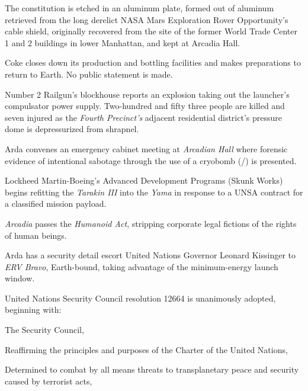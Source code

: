 The constitution is etched in an aluminum plate, formed out of aluminum retrieved from the long derelict NASA Mars Exploration Rover Opportunity's cable shield, originally recovered from the site of the former World Trade Center 1 and 2 buildings in lower Manhattan, and kept at Arcadia Hall.

\StopTimelineDate

Coke closes down its production and bottling facilities and makes preparations to return to Earth. No public statement is made.
\StopTimelineDate

Number 2 Railgun's blockhouse reports an explosion taking out the launcher's compulsator power supply. Two-hundred and fifty three people are killed and seven injured as the {\it Fourth Precinct's} adjacent residential district's pressure dome is depressurized from shrapnel.

Arda convenes an emergency cabinet meeting at {\it Arcadian Hall} where forensic evidence of intentional sabotage through the use of a cryobomb (/) is presented.
\StopTimelineDate

Lockheed Martin-Boeing's Advanced Development Programs (Skunk Works) begins refitting the {\it Tarakin III} into the {\it Yama} in response to a UNSA contract for a classified mission payload.
\StopTimelineDate

{\it Arcadia} passes the {\it Humanoid Act}, stripping corporate legal fictions of the rights of human beings.
\StopTimelineDate

Arda has a security detail escort United Nations Governor Leonard Kissinger to {\it ERV Bravo}, Earth-bound, taking advantage of the minimum-energy launch window.
\StopTimelineDate

United Nations Security Council resolution 12664 is unanimously adopted, beginning with:

\startTimelineDocument
The Security Council,

Reaffirming the principles and purposes of the Charter of the United Nations,

Determined to combat by all means threats to transplanetary peace and security caused by terrorist acts,

